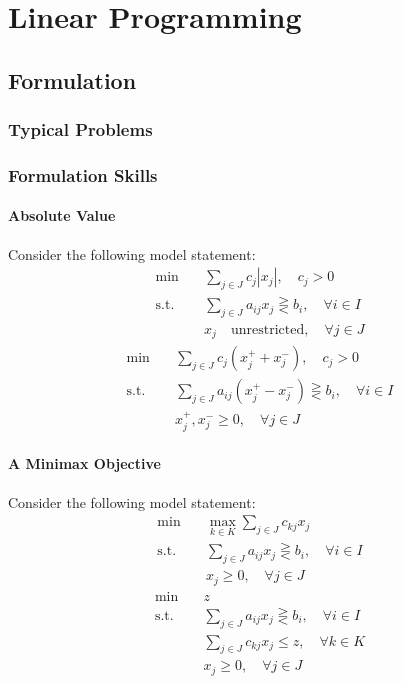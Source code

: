 \part{Linear Programming}
	\chapter{Formulation}
		\section{Typical Problems}

		\section{Formulation Skills}
			\subsection{Absolute Value}
				Consider the following model statement:
				\begin{align}
					\min \quad & \sum_{j\in J}c_j|x_j|, \quad c_j > 0 \nonumber\\
					\text{s.t.} \quad & \sum_{j\in J}a_{ij}x_j \gtreqless b_i, \quad \forall i\in I \nonumber\\
					                  & x_j \quad \text{unrestricted}, \quad \forall j\in J \nonumber
				\end{align}
				\begin{align}
					\min \quad & \sum_{j\in J}c_j(x_j^+ + x_j^-), \quad c_j > 0 \nonumber\\
					\text{s.t.} \quad & \sum_{j\in J}a_{ij}(x_j^+ - x_j^-) \gtreqless b_i, \quad \forall i\in I \nonumber\\
					                  & x_j^+, x_j^- \ge 0, \quad \forall j\in J \nonumber
				\end{align}

			\subsection{A Minimax Objective}
				Consider the following model statement:
				\begin{align}
					\min \quad & \max_{k\in K}\sum_{j\in J}c_{kj}x_j \nonumber\\
					\text{s.t.} \quad & \sum_{j\in J}a_{ij}x_j \gtreqless b_i, \quad \forall i\in I \nonumber\\
					                  & x_j \ge 0, \quad \forall j\in J \nonumber
				\end{align}
				\begin{align}
					\min \quad & z \nonumber\\
					\text{s.t.} \quad & \sum_{j\in J}a_{ij}x_j \gtreqless b_i, \quad \forall i\in I \nonumber\\
									  & \sum_{j\in J}c_{kj}x_j \le z, \quad \forall k\in K \nonumber\\
					                  & x_j \ge 0, \quad \forall j\in J \nonumber
				\end{align}
